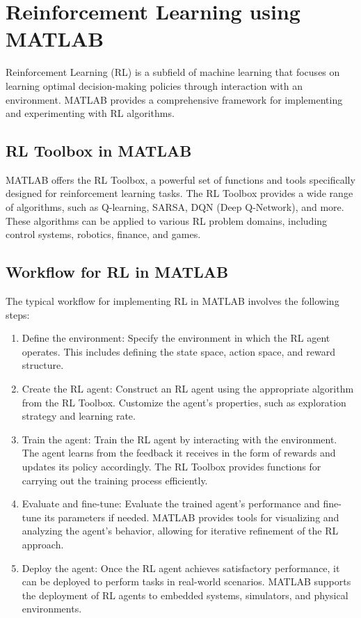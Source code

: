\documentclass{article}
\begin{document}
\section{Reinforcement Learning using MATLAB}

Reinforcement Learning (RL) is a subfield of machine learning that focuses on learning optimal decision-making policies through interaction with an environment. MATLAB provides a comprehensive framework for implementing and experimenting with RL algorithms.

\subsection{RL Toolbox in MATLAB}

MATLAB offers the RL Toolbox, a powerful set of functions and tools specifically designed for reinforcement learning tasks. The RL Toolbox provides a wide range of algorithms, such as Q-learning, SARSA, DQN (Deep Q-Network), and more. These algorithms can be applied to various RL problem domains, including control systems, robotics, finance, and games.

\subsection{Workflow for RL in MATLAB}

The typical workflow for implementing RL in MATLAB involves the following steps:

\begin{enumerate}
    \item Define the environment: Specify the environment in which the RL agent operates. This includes defining the state space, action space, and reward structure.
    
    \item Create the RL agent: Construct an RL agent using the appropriate algorithm from the RL Toolbox. Customize the agent's properties, such as exploration strategy and learning rate.
    
    \item Train the agent: Train the RL agent by interacting with the environment. The agent learns from the feedback it receives in the form of rewards and updates its policy accordingly. The RL Toolbox provides functions for carrying out the training process efficiently.
    
    \item Evaluate and fine-tune: Evaluate the trained agent's performance and fine-tune its parameters if needed. MATLAB provides tools for visualizing and analyzing the agent's behavior, allowing for iterative refinement of the RL approach.
    
    \item Deploy the agent: Once the RL agent achieves satisfactory performance, it can be deployed to perform tasks in real-world scenarios. MATLAB supports the deployment of RL agents to embedded systems, simulators, and physical environments.
\end{enumerate}
\end{document}
